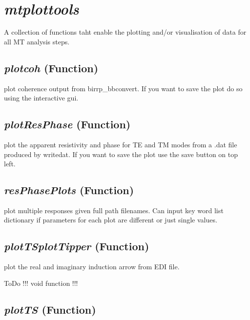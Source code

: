 \section{\textit{mtplottools} }
\label{sec:imaging.mtplottools}

A collection of functions taht enable the plotting and/or visualisation of data for all MT analysis steps. 

\subsection{\textit{plotcoh} (Function)}
\label{ssec:imaging.mtplottools.plotcoh}

plot coherence output from birrp\_bbconvert.  If you want to save the
    plot do so using the interactive gui.

\subsection{\textit{plotResPhase} (Function)}
\label{ssec:imaging.mtplottools.plotResPhase}

plot the apparent resistivity and 
    phase for TE and TM modes 
    from a .dat file produced by writedat.  If you want to save the plot 
    use the save button on top left.

\subsection{\textit{resPhasePlots} (Function)}
\label{ssec:imaging.mtplottools.resPhasePlots}

plot multiple responses given full path filenames.  
    Can input key word list dictionary if parameters for each plot are different
    or just single values.

\subsection{\textit{plotTSplotTipper} (Function)}
\label{ssec:imaging.plotTSmtplottools.plotTipper}

plot the real and imaginary induction arrow from EDI file.

ToDo !!! void function !!!

\subsection{\textit{plotTS} (Function)}
\label{ssec:imaging.mtplottools.plotTS}

